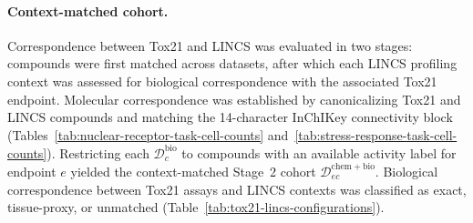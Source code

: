 \documentclass[11pt,a4paper]{article}
\begin{document}
\paragraph{Context-matched cohort.}
Correspondence between Tox21 and LINCS was evaluated in two stages:
compounds were first matched across datasets, after which each LINCS
profiling context was assessed for biological correspondence with the
associated Tox21 endpoint. Molecular correspondence was established by canonicalizing Tox21 and
LINCS compounds and matching the 14-character InChIKey connectivity
block (Tables~\ref{tab:nuclear-receptor-task-cell-counts}
and~\ref{tab:stress-response-task-cell-counts}).
Restricting each $\mathcal D^{\mathrm{bio}}_c$ to compounds with an
available activity label for endpoint $e$ yielded the context-matched
Stage~2 cohort $\mathcal D^{\mathrm{chem+bio}}_{ec}$. Biological correspondence between Tox21 assays and LINCS contexts was
classified as exact, tissue-proxy, or unmatched
(Table~\ref{tab:tox21-lincs-configurations}).

\clearpage
\end{document}
